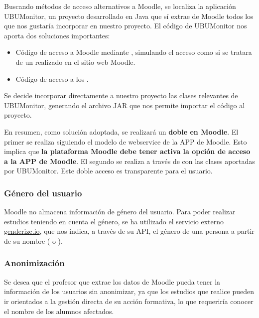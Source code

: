 Buscando métodos de acceso alternativos a Moodle, se localiza la aplicación UBUMonitor, un proyecto desarrollado 
en Java que sí extrae de Moodle todos los  que nos gustaría incorporar en nuestro proyecto. El código de UBUMonitor 
nos aporta dos soluciones importantes: 

\begin{itemize}
	\item Código de acceso a Moodle mediante , simulando el acceso como si se tratara de un  realizado en el sitio web Moodle. 
	\item Código de acceso a los .
\end{itemize}

Se decide incorporar directamente a nuestro proyecto las clases relevantes de UBUMonitor, generando el archivo JAR que nos
permite importar el código al proyecto. 
\

En resumen, como solución adoptada, se realizará un \textbf{doble  en Moodle}. El primer  se realiza siguiendo el modelo de webservice de la APP de Moodle. Esto 
implica que \textbf{la plataforma Moodle debe tener activa la opción de acceso a la APP de Moodle}. El segundo  se realiza
a través de  con las clases aportadas por UBUMonitor. Este doble acceso es transparente para el usuario. 

\subsubsection{Género del usuario}

Moodle no almacena información de género del usuario. Para poder realizar estudios teniendo en cuenta el género, se ha 
utilizado el servicio externo \href{https://genderize.io/}{genderize.io}, que nos indica, a través de su API, el género de una 
persona a partir de su nombre ( o ). 


\subsubsection{Anonimización}

Se desea que el profesor que extrae los datos de Moodle pueda tener la información de los usuarios sin anonimizar, ya que los 
estudios que realice pueden ir orientados a la gestión directa de su acción formativa, lo que requeriría conocer el nombre
de los alumnos afectados. 
\

